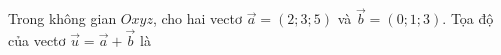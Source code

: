 \begin{ex}
Trong không gian $Oxyz$, cho hai vectơ $\vec a=(2;3;5)$ và $\vec b=(0;1;3)$. Tọa độ của vectơ $\vec u=\vec a+\vec b$ là
\end{ex}
